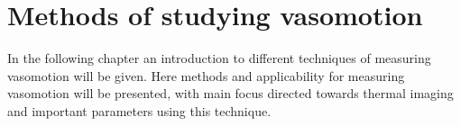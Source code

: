 \chapter{Methods of studying vasomotion}

In the following chapter an introduction to different techniques of measuring vasomotion will be given. Here methods and applicability for measuring vasomotion will be presented, with main focus directed towards thermal imaging and important parameters using this technique. 
